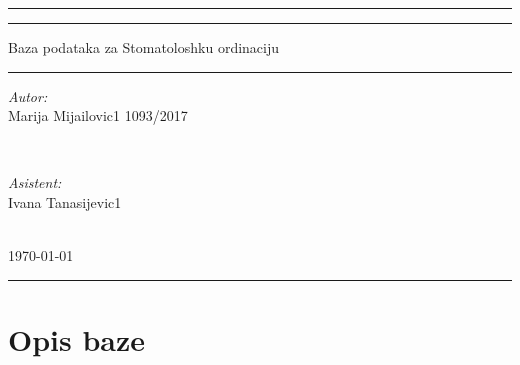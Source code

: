 \documentclass[10 pt]{article}
\begin{document}
	
\begin{titlepage} 
	\centering 
	
	\rule{\textwidth}{1pt}
	
	\vspace{2pt}\vspace{-\baselineskip} 
	
	\rule{\textwidth}{0.4pt}
	
	\vspace{0.025\textheight}

	{\Huge Baza podataka za Stomatoloshku ordinaciju}
	
	\vspace{0.020\textheight}
	
	\rule{0.5\textwidth}{1pt}
	
	\vspace{0.5\textheight}
	
	\begin{minipage}{0.4\textwidth}
		\begin{flushleft} \large
			\emph{Autor:}\\
			Marija Mijailovic1 1093/2017
		\end{flushleft}
	\end{minipage}
	~
	\begin{minipage}{0.4\textwidth}
		\begin{flushright} \large
			\emph{Asistent:} \\
			Ivana Tanasijevic1
		\end{flushright}
	\end{minipage}\\[2cm]

	{\large \today}\\[2cm]
	
	\rule{1\textwidth}{1.5pt}
	
\end{titlepage}
	

\thispagestyle{empty}

\newpage
\renewcommand*\contentsname{Sadrzhaj:}
\tableofcontents

\newpage
\section{Opis baze}
\end{document}

